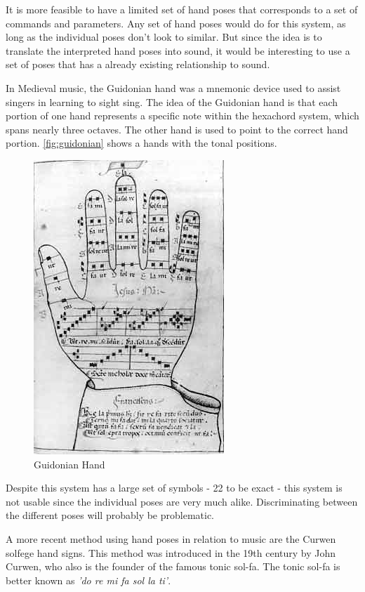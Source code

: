 It is more feasible to have a limited set of hand poses that corresponds to a set of commands and parameters.  Any set of hand poses would do for this system, as long as the individual poses don't look to similar.  But since the idea is to translate the interpreted hand poses into sound, it would be interesting to use a set of poses that has a already existing relationship to sound.

In Medieval music, the Guidonian hand was a mnemonic device used to assist singers in learning to sight sing. The idea of the Guidonian hand is that each portion of one hand represents a specific note within the hexachord system, which spans nearly three octaves. The other hand is used to point to the correct hand portion. \autoref{fig:guidonian} shows a hands with the tonal positions.

\begin{figure}[htbp]
	\centering{}
	\includegraphics[width=0.3\linewidth]{figures/guidonian_hand.jpg}
	\caption{Guidonian Hand}
	\label{fig:guidonian}
\end{figure}

Despite this system has a large set of symbols - 22 to be exact - this system is not usable since the individual poses are very much alike. Discriminating between the different poses will probably be problematic.

A more recent method using hand poses in relation to music are the Curwen solfege hand signs\cite{choksy1999}. This method was introduced in the 19th century by John Curwen, who also is the founder of the famous tonic sol-fa. The tonic sol-fa is better known as \emph{'do re mi fa sol la ti'}.


